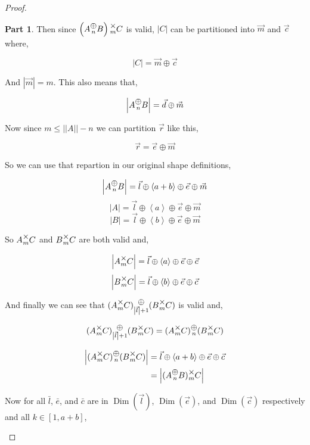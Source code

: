 \documentclass[12pt]{book}
\theoremstyle{plain}
\theoremstyle{definition}
\theoremstyle{ppart}
\newtheorem{ppart}{Part}
\theoremstyle{case}
\theoremstyle{solution}
\DeclareMathOperator{\Dim}{Dim}
\newcommand{\mmult}[1]{\text{\raisebox{1ex}{$\underset{#1}{\times}$}}}
\newcommand{\mconcat}[1]{\text{\raisebox{1ex}{$\underset{#1}{\oplus}$}}}
\newcommand{\shape}[1]{\left|#1\right|}
\begin{document}
\begin{proof}
\begin{ppart}
Then since $\left(A \mconcat{n} B\right) \mmult{m} C$ is valid, $\shape{C}$ can
be partitioned into $\vec{m}$ and $\vec{c}$ where,

\[ \shape{C} = \vec{m} \oplus \vec{c} \]

And $\shape{\vec{m}} = m$. This also means that,

\[ \shape{A \mconcat{n} B} = \vec{d} \oplus \vec{m} \]

Now since $m \le \shape{\shape{A}}-n$ we can partition $\vec{r}$ like this,

\[ \vec{r} = \vec{e} \oplus \vec{m} \]

So we can use that repartion in our original shape definitions,

\[ \shape{A \mconcat{n} B} = \vec{l} \oplus \left<a+b\right> \oplus \vec{e} \oplus \vec{m} \]
\[ \shape{A} = \vec{l} \oplus \left<a\right> \oplus \vec{e} \oplus \vec{m} \]
\[ \shape{B} = \vec{l} \oplus \left<b\right> \oplus \vec{e} \oplus \vec{m} \]

So $A \mmult{m} C$ and $B \mmult{m} C$ are both valid and,

\[ \shape{A \mmult{m} C} = \vec{l} \oplus \left<a\right> \oplus \vec{e} \oplus \vec{c} \]
\[ \shape{B \mmult{m} C} = \vec{l} \oplus \left<b\right> \oplus \vec{e} \oplus \vec{c} \]

And finally we can see that $(A \mmult{m} C) \mconcat{\shape{\vec{l}}+1} (B \mmult{m} C)$
is valid and,

\[
  (A \mmult{m} C) \mconcat{\shape{\vec{l}}+1} (B \mmult{m} C)
  =
  (A \mmult{m} C) \mconcat{n} (B \mmult{m} C)
\]

\begin{align*}
  \shape{(A \mmult{m} C) \mconcat{n} (B \mmult{m} C)}
  &= \vec{l} \oplus \left<a+b\right> \oplus \vec{e} \oplus \vec{c} \\
  &= \shape{(A \mconcat{n} B) \mmult{m} C}
\end{align*}

\begin{landscape}
Now for all $\bar{l}$, $\bar{e}$, and $\bar{c}$ are in $\Dim(\vec{l})$, $\Dim(\vec{e})$,
and $\Dim(\vec{c})$ respectively and all $k \in [1,a+b]$,


\end{landscape}
\end{ppart}
\end{proof}
\end{document}
